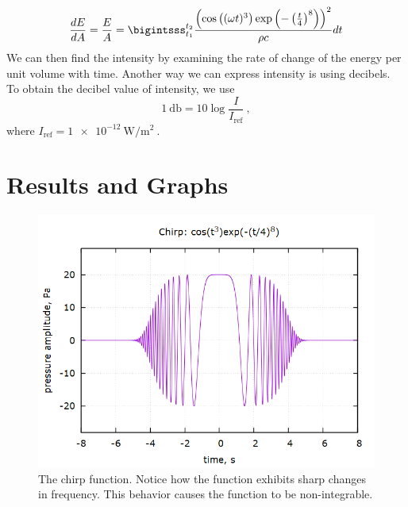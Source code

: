 \documentclass[aps,prl,twocolumn,superscriptaddress]{revtex4-1}
\newcommand{\paren}[1]{\left( #1 \right)} 	%
\begin{document}
\begin{equation}
\frac{dE}{dA} = \frac{E}{A} = \bigintsss_{t_1}^{t_2} \frac{\paren{\cos \paren{(\omega t)^3} \exp \paren{-\paren{\frac{t}{4}}^8}}^2}{\rho c} dt \label{eqn:fchirp}
\end{equation}
We can then find the intensity by examining the rate of change of the energy per unit volume with time. Another way we can express intensity is using decibels. To obtain the decibel value of intensity, we use \cite{Laulima}
\begin{equation}
\SI{1}{\decibel} = 10 \log \frac{I}{I_\text{ref}} ~, \label{eqn:db}
\end{equation}
where $I_\text{ref} = \SI{1e-12}{\watt\per\meter\squared}~$.

\section{Results and Graphs}

\begin{figure}[htbp]
  	\begin{center}
 		\includegraphics[scale=0.3]{chirp.png} 
  		\caption{The chirp function. Notice how the function exhibits sharp changes in frequency. This behavior causes the function to be non-integrable.}
  		\label{gr:chirp}
 	\end{center}
\end{figure}
\end{document}
